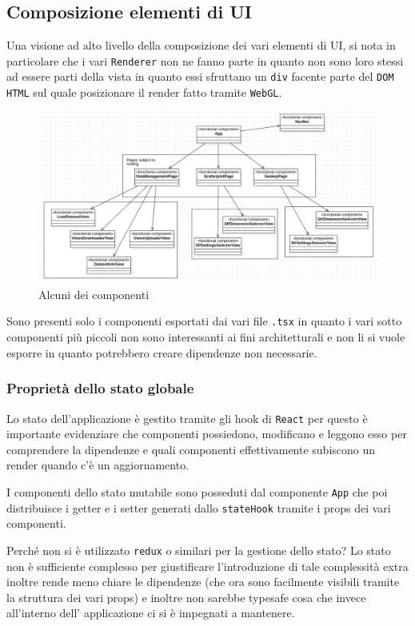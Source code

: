 \subsection{Composizione elementi di UI}
Una visione ad alto livello della composizione dei vari elementi di UI, si nota in
particolare che i vari \texttt{Renderer} non ne fanno parte in quanto non sono
loro stessi ad essere parti della vista in quanto essi sfruttano un \texttt{div}
facente parte del \texttt{DOM HTML} sul quale posizionare il render
fatto tramite \texttt{WebGL}.

\begin{figure}[h!]
  \centering
  \includegraphics[scale=0.55]{../../assets/classi_uml/vistaglobale.png}
  \caption{Alcuni dei componenti}
\end{figure}

Sono presenti solo i componenti esportati dai vari file \texttt{.tsx} in quanto i vari
sotto componenti più piccoli non sono interessanti ai fini architetturali e non li si vuole
esporre in quanto potrebbero creare dipendenze non necessarie.

\subsubsection{Proprietà dello stato globale}
Lo stato dell'applicazione è gestito tramite gli hook di \texttt{React} per questo è importante
evidenziare che componenti possiedono, modificano e leggono esso per comprendere la dipendenze
e quali componenti effettivamente subiscono un render quando c'è un aggiornamento.

I componenti dello stato mutabile sono posseduti dal componente \texttt{App} che poi distribuisce
i getter e i setter generati dallo \texttt{stateHook} tramite i props dei vari componenti.

Perché non si è utilizzato \texttt{redux} o similari per la gestione dello stato? Lo stato
non è sufficiente complesso per giustificare l'introduzione di tale complessità extra inoltre
rende meno chiare le dipendenze (che ora sono facilmente visibili tramite la struttura dei
vari props) e inoltre non sarebbe typesafe cosa che invece all'interno dell' applicazione
ci si è impegnati a mantenere.

